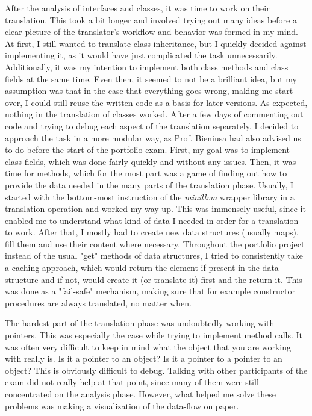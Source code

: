 After the analysis of interfaces and classes, it was time to
work on their translation.
This took a bit longer and involved trying out many ideas before
a clear picture of the translator's workflow and behavior was
formed in my mind. At first, I still wanted to translate class inheritance, but
I quickly decided against implementing it, as it would have just complicated
the task unnecessarily. Additionally, it was my intention to implement
both class methods and class fields at the same time.
Even then, it seemed to not be a brilliant idea, but
my assumption was that in the case that everything goes wrong, making me
start over, I could still reuse the written code as a basis for later versions. 
As expected, nothing in the translation of classes worked.
After a few days of commenting out code and trying to debug
each aspect of the translation separately, I decided to
approach the task in a more modular way, as Prof. Bieniusa had also advised
us to do before the start of the portfolio exam.
First, my goal was to implement class fields, which was done 
fairly quickly and without any issues.
Then, it was time for methods, which for the most part was
a game of finding out how to provide
the data needed in the many parts of the translation phase.
Usually, I started with the bottom-most instruction
of the \textit{minillvm} wrapper library
in a translation operation and worked my way up.
This was immensely useful, since it enabled me to
understand what kind of data I needed in order for a translation to work.
After that, I mostly had to create new data structures (usually maps),
fill them and use their content where necessary.
Throughout the portfolio project instead of the usual "get" methods
of data structures, I tried to
consistently take a caching approach, which would return the element if present
in the data structure and if not, would create it (or translate it) 
first and the return it. This was done as a "fail-safe" mechanism,
making sure that for example constructor procedures are always
translated, no matter when.

The hardest part of the translation phase was undoubtedly working with
pointers. This was especially the case
while trying to implement method calls.
It was often very difficult to keep in mind what the object that you
are working with really is. Is it a pointer to an object?
Is it a pointer to a pointer to an object?
This is obviously difficult to debug.
Talking with other participants of the exam did not really help at that point, 
since many of them were still concentrated on the analysis phase.
However, what helped me solve these problems was making a visualization of
the data-flow on paper.

